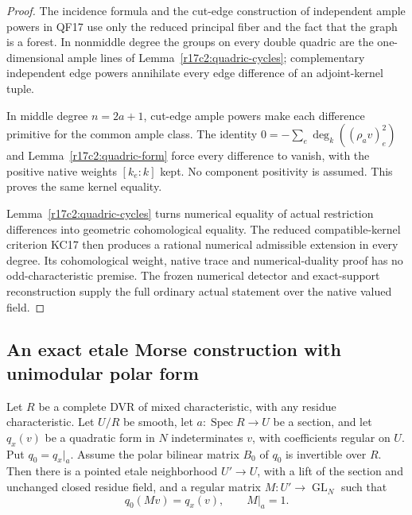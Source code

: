 \begin{proof}
The incidence formula and the cut-edge construction of
independent ample powers in QF17 use only the reduced
principal fiber and the fact that the graph is a forest.
In nonmiddle degree the groups on every double quadric
are the one-dimensional ample lines of
Lemma~\ref{r17c2:quadric-cycles}; complementary independent
edge powers annihilate every edge difference of an
adjoint-kernel tuple.

In middle degree $n=2a+1$, cut-edge ample powers make
each difference primitive for the common ample class.
The identity
$0=-\sum_e\deg_k((\rho_a v)_e^2)$ and
Lemma~\ref{r17c2:quadric-form} force every difference to
vanish, with the positive native weights $[k_e:k]$ kept.
No component positivity is assumed. This proves the same
kernel equality.

Lemma~\ref{r17c2:quadric-cycles} turns numerical equality
of actual restriction differences into geometric
cohomological equality. The reduced compatible-kernel
criterion KC17 then produces a rational numerical
admissible extension in every degree. Its cohomological
weight, native trace and numerical-duality proof has no
odd-characteristic premise. The frozen numerical detector
and exact-support reconstruction supply the full ordinary
actual statement over the native valued field.
\end{proof}

\subsection{An exact etale Morse construction with unimodular polar form}

\begin{lemma}
\label{r17c2:isometry-slice}
Let $R$ be a complete DVR of mixed characteristic, with
any residue characteristic. Let $U/R$ be smooth, let
$a:\operatorname{Spec}R\to U$ be a section, and let
$q_x(v)$ be a quadratic form in $N$ indeterminates $v$,
with coefficients regular on $U$. Put $q_0=q_x|_a$.
Assume the polar bilinear matrix $B_0$ of $q_0$ is
invertible over $R$. Then there is a pointed etale
neighborhood $U'\to U$, with a lift of the section and
unchanged closed residue field, and a regular matrix
$M:U'\to\operatorname{GL}_N$ such that
\[
                  q_0(Mv)=q_x(v),\qquad M|_a=1.
 \tag{C217.4}\label{r17c2:isometry}
\]
\end{lemma}

